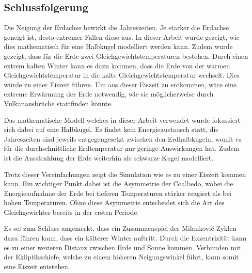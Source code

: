 \begin{refsection}
\section{Schlussfolgerung} \label{sec:schluss}
Die Neigung der Erdachse bewirkt die Jahreszeiten. Je stärker die
Erdachse geneigt ist, desto extremer Fallen diese aus. In dieser
Arbeit wurde gezeigt, wie dies mathematisch für eine Halbkugel
modelliert werden kann. Zudem wurde gezeigt, dass für die Erde zwei
Gleichgewichtstemperaturen bestehen. Durch einen extrem kalten
Winter kann es dazu kommen, dass die Erde von der warmen
Gleichgewichtstemperatur in die kalte Gleichgewichtstemperatur
wechselt. Dies würde zu einer Eiszeit führen. Um aus dieser Eiszeit
zu entkommen, wäre eine extreme Erwärmung der Erde notwendig, wie
sie möglicherweise durch Vulkanausbrüche stattfinden könnte.

Das mathematische Modell welches in dieser Arbeit verwendet wurde
fokussiert sich dabei auf eine Halbkugel. Es findet kein Energieaustausch
statt, die Jahreszeiten sind jeweils entgegengesetzt zwischen den
Erdhalbkugeln, womit es für die durchschnittliche Erdtemperatur nur
geringe Auswirkungen hat. Zudem ist die Ausstrahlung der Erde
weiterhin als schwarze Kugel modelliert.

Trotz dieser Vereinfachungen zeigt die Simulation wie es zu einer
Eiszeit kommen kann. Ein wichtiger Punkt dabei ist die Asymmetrie
der Coalbedo, wobei die Energieaufnahme der Erde bei tieferen
Temperaturen stärker reagiert als bei hohen Temperaturen. Ohne diese
Asymmetrie entscheidet sich die Art des Gleichgewichtes bereits in
der ersten Periode.

Es sei zum Schluss angemerkt, dass ein Zusammenspiel der Milankovi\'c
Zyklen dazu führen kann, dass ein kälterer Winter auftritt. Durch
die Exzentrizität kann es zu einer weiteren Distanz zwischen Erde
und Sonne kommen. Verbunden mit der Ekliptikschiefe, welche zu einem
höheren Neigungswinkel führt, kann somit eine Eiszeit entstehen.


\printbibliography[heading=subbibliography]
\end{refsection}

